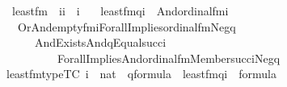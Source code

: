 \begin{isabellebody}
\isanewline
{}\isamarkupfalse%
\isanewline
\ \ least{\isacharunderscore}{\kern0pt}fm\ {\isacharcolon}{\kern0pt}{\isacharcolon}{\kern0pt}\ {\isachardoublequoteopen}{\isacharbrackleft}{\kern0pt}i{\isacharcomma}{\kern0pt}i{\isacharbrackright}{\kern0pt}\ {\isasymRightarrow}\ i{\isachardoublequoteclose}\ \isanewline
\ \ {\isachardoublequoteopen}least{\isacharunderscore}{\kern0pt}fm{\isacharparenleft}{\kern0pt}q{\isacharcomma}{\kern0pt}i{\isacharparenright}{\kern0pt}\ {\isasymequiv}\ And{\isacharparenleft}{\kern0pt}ordinal{\isacharunderscore}{\kern0pt}fm{\isacharparenleft}{\kern0pt}i{\isacharparenright}{\kern0pt}{\isacharcomma}{\kern0pt}\isanewline
\ \ \ Or{\isacharparenleft}{\kern0pt}And{\isacharparenleft}{\kern0pt}empty{\isacharunderscore}{\kern0pt}fm{\isacharparenleft}{\kern0pt}i{\isacharparenright}{\kern0pt}{\isacharcomma}{\kern0pt}Forall{\isacharparenleft}{\kern0pt}Implies{\isacharparenleft}{\kern0pt}ordinal{\isacharunderscore}{\kern0pt}fm{\isacharparenleft}{\kern0pt}{}{\isacharparenright}{\kern0pt}{\isacharcomma}{\kern0pt}Neg{\isacharparenleft}{\kern0pt}q{\isacharparenright}{\kern0pt}{\isacharparenright}{\kern0pt}{\isacharparenright}{\kern0pt}{\isacharparenright}{\kern0pt}{\isacharcomma}{\kern0pt}\ \isanewline
\ \ \ \ \ \ And{\isacharparenleft}{\kern0pt}Exists{\isacharparenleft}{\kern0pt}And{\isacharparenleft}{\kern0pt}q{\isacharcomma}{\kern0pt}Equal{\isacharparenleft}{\kern0pt}{}{\isacharcomma}{\kern0pt}succ{\isacharparenleft}{\kern0pt}i{\isacharparenright}{\kern0pt}{\isacharparenright}{\kern0pt}{\isacharparenright}{\kern0pt}{\isacharparenright}{\kern0pt}{\isacharcomma}{\kern0pt}\isanewline
\ \ \ \ \ \ \ \ \ \ Forall{\isacharparenleft}{\kern0pt}Implies{\isacharparenleft}{\kern0pt}And{\isacharparenleft}{\kern0pt}ordinal{\isacharunderscore}{\kern0pt}fm{\isacharparenleft}{\kern0pt}{}{\isacharparenright}{\kern0pt}{\isacharcomma}{\kern0pt}Member{\isacharparenleft}{\kern0pt}{}{\isacharcomma}{\kern0pt}succ{\isacharparenleft}{\kern0pt}i{\isacharparenright}{\kern0pt}{\isacharparenright}{\kern0pt}{\isacharparenright}{\kern0pt}{\isacharcomma}{\kern0pt}Neg{\isacharparenleft}{\kern0pt}q{\isacharparenright}{\kern0pt}{\isacharparenright}{\kern0pt}{\isacharparenright}{\kern0pt}{\isacharparenright}{\kern0pt}{\isacharparenright}{\kern0pt}{\isacharparenright}{\kern0pt}{\isachardoublequoteclose}\isanewline
\isanewline
{}\isamarkupfalse%
\ least{\isacharunderscore}{\kern0pt}fm{\isacharunderscore}{\kern0pt}type{\isacharbrackleft}{\kern0pt}TC{\isacharbrackright}{\kern0pt}\ {\isacharcolon}{\kern0pt}{\isachardoublequoteopen}i\ {\isasymin}\ nat\ {\isasymLongrightarrow}\ q{\isasymin}formula\ {\isasymLongrightarrow}\ least{\isacharunderscore}{\kern0pt}fm{\isacharparenleft}{\kern0pt}q{\isacharcomma}{\kern0pt}i{\isacharparenright}{\kern0pt}\ {\isasymin}\ formula{\isachardoublequoteclose}\isanewline

\end{isabellebody}
